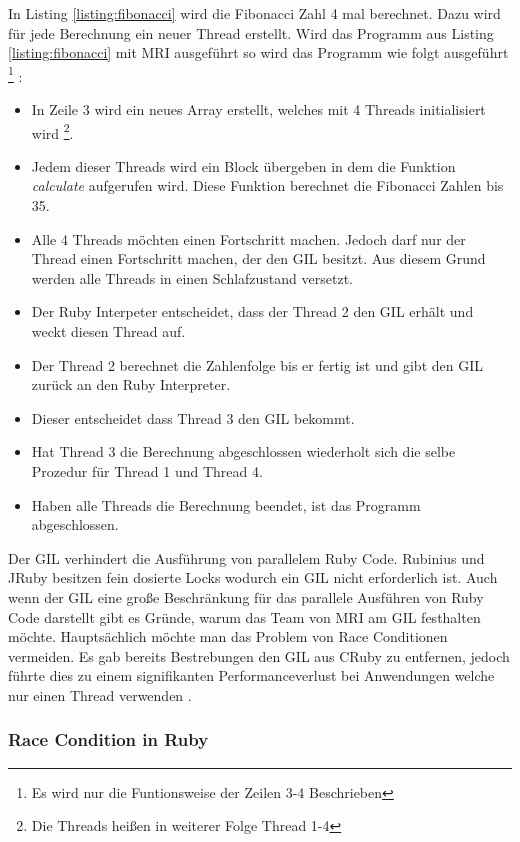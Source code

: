 In Listing \ref{listing:fibonacci} wird die Fibonacci Zahl 4 mal berechnet. Dazu wird für jede Berechnung ein neuer Thread erstellt. Wird das Programm aus Listing \ref{listing:fibonacci} mit MRI ausgeführt so wird das Programm wie folgt ausgeführt \footnote{Es wird nur die Funtionsweise der Zeilen 3-4 Beschrieben} \cite[p. 45-46]{Sto2013}: 

\begin{itemize}
  \item In Zeile 3 wird ein neues Array erstellt, welches mit 4 Threads initialisiert wird \footnote{Die Threads heißen in weiterer Folge Thread 1-4}.
  \item Jedem dieser Threads wird ein Block übergeben in dem die Funktion \emph{calculate} aufgerufen wird. Diese Funktion berechnet die Fibonacci Zahlen bis 35.
  \item Alle 4 Threads möchten einen Fortschritt machen. Jedoch darf nur der Thread einen Fortschritt machen, der den GIL besitzt. Aus diesem Grund werden alle Threads in einen Schlafzustand versetzt.
  \item Der Ruby Interpeter entscheidet, dass der Thread 2 den GIL erhält und weckt diesen Thread auf.
  \item Der Thread 2 berechnet die Zahlenfolge bis er fertig ist und gibt den GIL zurück an den Ruby Interpreter.
  \item Dieser entscheidet dass Thread 3 den GIL bekommt.
  \item Hat Thread 3 die Berechnung abgeschlossen wiederholt sich die selbe Prozedur für Thread 1 und Thread 4.
  \item Haben alle Threads die Berechnung beendet, ist das Programm abgeschlossen.
\end{itemize}

Der GIL verhindert die Ausführung von parallelem Ruby Code. Rubinius und JRuby besitzen fein dosierte Locks wodurch ein GIL nicht erforderlich ist. Auch wenn der GIL eine große Beschränkung für das parallele Ausführen von Ruby Code darstellt gibt es Gründe, warum das Team von MRI am GIL festhalten möchte. Hauptsächlich möchte man das Problem von Race Conditionen vermeiden. Es gab bereits Bestrebungen den GIL aus CRuby zu entfernen, jedoch führte dies zu einem signifikanten Performanceverlust bei Anwendungen welche nur einen Thread verwenden \cite[p. 48-49]{Sto2013}.

\subsubsection{Race Condition in Ruby}

